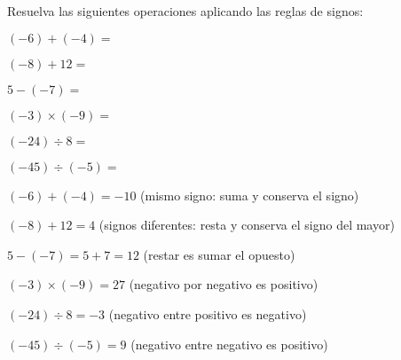 \begin{exercise}
\problem Resuelva las siguientes operaciones aplicando las reglas de signos:

\begin{exerciselist}
    \item $(-6) + (-4) = $ \underline{\hspace{3cm}}
    \item $(-8) + 12 = $ \underline{\hspace{3cm}}
    \item $5 - (-7) = $ \underline{\hspace{3cm}}
    \item $(-3) \times (-9) = $ \underline{\hspace{3cm}}
    \item $(-24) \div 8 = $ \underline{\hspace{3cm}}
    \item $(-45) \div (-5) = $ \underline{\hspace{3cm}}
\end{exerciselist}

\begin{solucion}
\begin{exerciselist}
    \item $(-6) + (-4) = -10$ (mismo signo: suma y conserva el signo)
    \item $(-8) + 12 = 4$ (signos diferentes: resta y conserva el signo del mayor)
    \item $5 - (-7) = 5 + 7 = 12$ (restar es sumar el opuesto)
    \item $(-3) \times (-9) = 27$ (negativo por negativo es positivo)
    \item $(-24) \div 8 = -3$ (negativo entre positivo es negativo)
    \item $(-45) \div (-5) = 9$ (negativo entre negativo es positivo)
\end{exerciselist}
\end{solucion}
\end{exercise}

